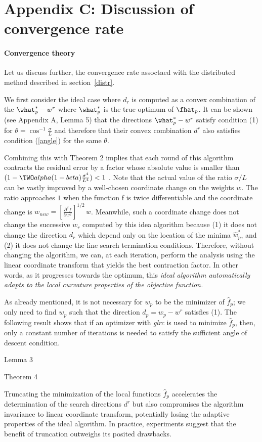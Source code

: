 \section{Appendix C: Discussion of convergence rate}
\label{appc}

\paragraph{Convergence theory}

Let us discuss further, the convergence rate assoctaed with the distributed method described in section~\ref{distr}.

We first consider the ideal case where $d_r$ is computed as a convex combination of the $\what^*_p-w^r$ where
$\what^*_p$ is the true optimum of $\fhat_p$.   It can be shown (see Appendix A, Lemma 5) that the directions $\what^*_p-w^r$ satisfy condition (1) for $\theta=\cos^{-1}\frac{\sigma}{L}$ and therefore that their convex combination $d^r$ also satisfies condition (\ref{angle}) for the same $\theta$.

Combining this with Theorem 2 implies that each round of this algorithm contracts the residual error by a factor whose absolute value is smaller than  $  (1 -  \TWO alpha(1-beta) \frac{\sigma^4}{L^4} ) < 1$ .   Note that the actual value
of the ratio $\sigma/L$ can be vastly improved by a well-chosen coordinate change on the weights $w$.  The ratio approaches $1$ when the function f is twice differentiable and the coordinate change is $w_{new}=\left[\frac{\partial^2 f}{\partial w^2}\right]^{1/2}\,w$.   Meanwhile, such a coordinate change does not change the successive $w_r$ computed by this idea algorithm because (1) it does not change the direction $d_r$ which depend only on the location of the minima $\hat{w}^*_p$, and (2) it does not change the line search termination conditions. Therefore, without changing the algorithm, we can, at each iteration, perform the analysis using the linear coordinate transform that yields the best contraction factor.  In other words, as it progresses towards the optimum, this \emph{ideal algorithm automatically adapts to the local curvature properties of the objective function.}

As already mentioned, it is not necessary for $w_p$ to be the minimizer of $\hat{f}_p$; we only need to find $w_p$ such that the direction $d_p = w_p-w^r$ satisfies (1).
The following result shows that if an optimizer with \emph{glrc} is used to minimize $\hat{f}_p$, then, only a constant number of iterations is needed to satisfy  the sufficient angle of descent condition.

Lemma 3

Theorem 4

Truncating the minimization of the local functions $\hat{f}_p$ accelerates the determination of the search directions $d^r$ but also compromises the algorithm invariance to linear coordinate transform, potentially losing the adaptive properties of the ideal algorithm.  In practice, experiments suggest that the benefit of truncation outweighs its posited drawbacks.



